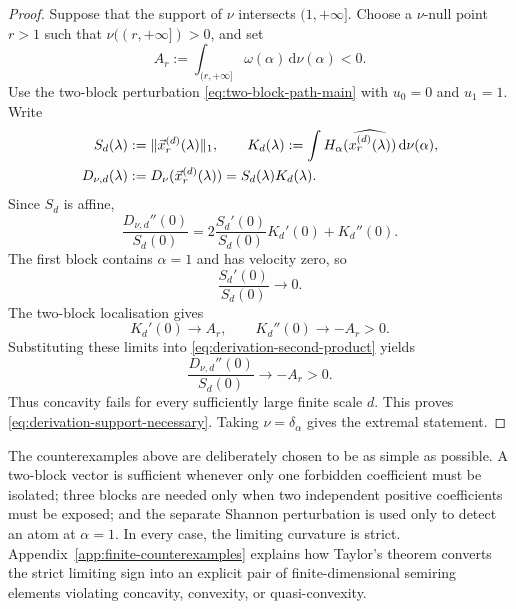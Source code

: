 \documentclass[aps,pra,11pt,onecolumn,nofootinbib,tightenlines]{revtex4-2}
\theoremstyle{definition}
\begin{document}
\begin{proof}
Suppose that the support of $\nu$ intersects $(1,+\infty]$. Choose a $\nu$-null point $r>1$ such that $\nu((r,+\infty])>0$, and set
\begin{equation}
 A_r:=\int_{(r,+\infty]}\omega(\alpha)\,\mathrm d\nu(\alpha)<0.
 \label{eq:derivation-A-r}
\end{equation}
Use the two-block perturbation \eqref{eq:two-block-path-main} with $u_0=0$ and $u_1=1$. Write
\begin{align}
 S_d(\lambda)&:=\|\vec x_r^{(d)}(\lambda)\|_1,
 \qquad
 K_d(\lambda):=
 \int H_\alpha(\widehat{x_r^{(d)}(\lambda)})\,\mathrm d\nu(\alpha),
 \notag\\
 D_{\nu,d}(\lambda)
 &:=D_\nu(\vec x_r^{(d)}(\lambda))
 =S_d(\lambda)K_d(\lambda).
 \label{eq:derivation-S-K}
\end{align}
Since $S_d$ is affine,
\begin{equation}
 \frac{D_{\nu,d}''(0)}{S_d(0)}
 =2\frac{S_d'(0)}{S_d(0)}K_d'(0)+K_d''(0).
 \label{eq:derivation-second-product}
\end{equation}
The first block contains $\alpha=1$ and has velocity zero, so
\begin{equation}
 \frac{S_d'(0)}{S_d(0)}\longrightarrow0.
 \label{eq:derivation-norm-derivative-zero}
\end{equation}
The two-block localisation gives
\begin{equation}
 K_d'(0)\longrightarrow A_r,
 \qquad
 K_d''(0)\longrightarrow-A_r>0.
 \label{eq:derivation-K-limits}
\end{equation}
Substituting these limits into \eqref{eq:derivation-second-product} yields
\begin{equation}
 \frac{D_{\nu,d}''(0)}{S_d(0)}
 \longrightarrow-A_r>0.
 \label{eq:derivation-positive-curvature}
\end{equation}
Thus concavity fails for every sufficiently large finite scale $d$. This proves \eqref{eq:derivation-support-necessary}. Taking $\nu=\delta_\alpha$ gives the extremal statement.
\end{proof}

The counterexamples above are deliberately chosen to be as simple as possible. A two-block vector is sufficient whenever only one forbidden coefficient must be isolated; three blocks are needed only when two independent positive coefficients must be exposed; and the separate Shannon perturbation is used only to detect an atom at $\alpha=1$. In every case, the limiting curvature is strict. Appendix~\ref{app:finite-counterexamples} explains how Taylor's theorem converts the strict limiting sign into an explicit pair of finite-dimensional semiring elements violating concavity, convexity, or quasi-convexity.
\end{document}
